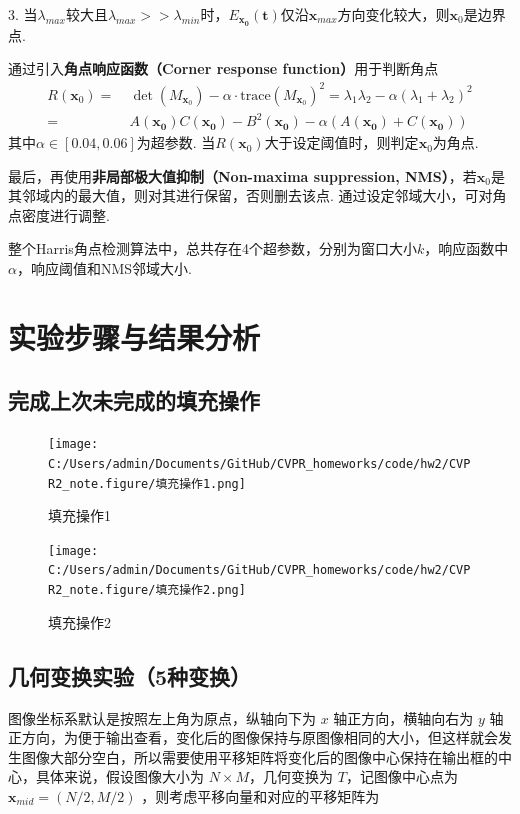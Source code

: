 \documentclass[12pt, a4paper, oneside]{ctexart}
\numberwithin{equation}{section}  %
\def\bd{\boldsymbol}        %
\begin{document}
3. 当$\lambda_{max}$较大且$\lambda_{max}>>\lambda_{min}$时，$E_{\bd{x_0}}(\bd{t})$仅沿$\bd{x}_{max}$方向变化较大，则$\bd{x}_0$是边界点.

通过引入\textbf{角点响应函数（Corner response function）}用于判断角点
\begin{align*}
    R(\bd{x}_0) =&\ \det(M_{\bd{x}_0}) - \alpha\cdot\text{trace}(M_{\bd{x}_0})^2 = \lambda_1\lambda_2 - \alpha(\lambda_1+\lambda_2)^2\\
    =&\ A(\bd{x_0})C(\bd{x_0}) - B^2(\bd{x_0}) - \alpha(A(\bd{x_0})+C(\bd{x_0}))
\end{align*}
其中$\alpha\in[0.04,0.06]$为超参数. 当$R(\bd{x}_0)$大于设定阈值时，则判定$\bd{x}_0$为角点.

最后，再使用\textbf{非局部极大值抑制（Non-maxima suppression, NMS）}，若$\bd{x}_0$是其邻域内的最大值，则对其进行保留，否则删去该点. 通过设定邻域大小，可对角点密度进行调整.

整个Harris角点检测算法中，总共存在4个超参数，分别为窗口大小$k$，响应函数中$\alpha$，响应阈值和NMS邻域大小.

\clearpage
\section{实验步骤与结果分析}
\subsection{完成上次未完成的填充操作}
\begin{figure}[htbp]
    \centering
    \hspace*{-1.5cm}
    \texttt{[image: C:/Users/admin/Documents/GitHub/CVPR\_homeworks/code/hw2/CVPR2\_note.figure/填充操作1.png]}
    \caption{填充操作1}
\end{figure}
\begin{figure}[htbp]
    \centering
    \hspace*{-1.5cm}
    \texttt{[image: C:/Users/admin/Documents/GitHub/CVPR\_homeworks/code/hw2/CVPR2\_note.figure/填充操作2.png]}
    \caption{填充操作2}
\end{figure}
\subsection{几何变换实验（5种变换）}
图像坐标系默认是按照左上角为原点，纵轴向下为 \(x\) 轴正方向，横轴向右为
\(y\)
轴正方向，为便于输出查看，变化后的图像保持与原图像相同的大小，但这样就会发生图像大部分空白，所以需要使用平移矩阵将变化后的图像中心保持在输出框的中心，具体来说，假设图像大小为
\(N\times M\)，几何变换为 \(T\)，记图像中心点为
\(\boldsymbol{x}_{mid} = (N/2,M/2)\) ，则考虑平移向量和对应的平移矩阵为
\end{document}
